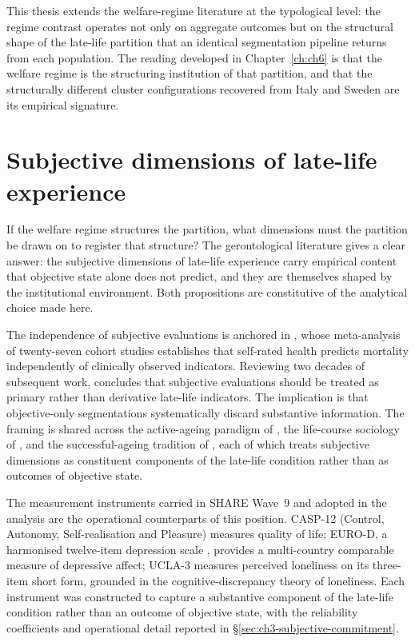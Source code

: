 This thesis extends the welfare-regime literature at the typological level: the regime contrast operates not only on aggregate outcomes but on the structural shape of the late-life partition that an identical segmentation pipeline returns from each population. The reading developed in Chapter~\ref{ch:ch6} is that the welfare regime is the structuring institution of that partition, and that the structurally different cluster configurations recovered from Italy and Sweden are its empirical signature.

\section{Subjective dimensions of late-life experience}
\label{sec:ch2-subjective-dimensions}

If the welfare regime structures the partition, what dimensions must the partition be drawn on to register that structure? The gerontological literature gives a clear answer: the subjective dimensions of late-life experience carry empirical content that objective state alone does not predict, and they are themselves shaped by the institutional environment. Both propositions are constitutive of the analytical choice made here.

 The independence of subjective evaluations is anchored in \citet{idlerbenyamini1997}, whose meta-analysis of twenty-seven cohort studies establishes that self-rated health predicts mortality independently of clinically observed indicators. Reviewing two decades of subsequent work, \citet{bowling2006} concludes that subjective evaluations should be treated as primary rather than derivative late-life indicators. The implication is that objective-only segmentations systematically discard substantive information. The framing is shared across the active-ageing paradigm of \citet{walker2005active}, the life-course sociology of \citet{lalivedepinay2005}, and the successful-ageing tradition of \citet{rowekahn1997}, each of which treats subjective dimensions as constituent components of the late-life condition rather than as outcomes of objective state.

The measurement instruments carried in SHARE Wave~9 and adopted in the analysis are the operational counterparts of this position. CASP-12 (Control, Autonomy, Self-realisation and Pleasure) \citep{hyde2003} measures quality of life; EURO-D, a harmonised twelve-item depression scale \citep{prince1999}, provides a multi-country comparable measure of depressive affect; UCLA-3 \citep{hughes2004} measures perceived loneliness on its three-item short form, grounded in the cognitive-discrepancy theory of loneliness. Each instrument was constructed to capture a substantive component of the late-life condition rather than an outcome of objective state, with the reliability coefficients and operational detail reported in \S\ref{sec:ch3-subjective-commitment}.

